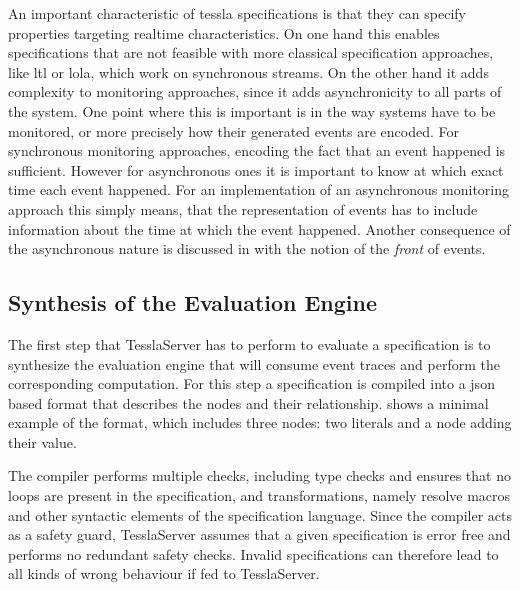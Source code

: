 An important characteristic of \gls{tessla} specifications is that they can specify properties targeting realtime characteristics.
On one hand this enables specifications that are not feasible with more classical specification approaches, like \gls{ltl} or \gls{lola}, which work on synchronous streams.
On the other hand it adds complexity to monitoring approaches, since it adds asynchronicity to all parts of the system.
One point where this is important is in the way systems have to be monitored, or more precisely how their generated events are encoded.
For synchronous monitoring approaches, encoding the fact that an event happened is sufficient.
However for asynchronous ones it is important to know at which exact time each event happened.
For an implementation of an asynchronous monitoring approach this simply means, that the representation of events has to include information about the time at which the event happened.
Another consequence of the asynchronous nature is discussed in  with the notion of the \emph{front} of events.

\subsection{Synthesis of the Evaluation Engine}

The first step that TesslaServer has to perform to evaluate a specification is to synthesize the evaluation engine that will consume event traces and perform the corresponding computation.
For this step a specification is compiled into a \gls{json} based format that describes the nodes and their relationship.
 shows a minimal example of the format, which includes three nodes: two literals and a node adding their value.



The compiler performs multiple checks, including type checks and ensures that no loops are present in the specification, and transformations, namely resolve macros and other syntactic elements of the specification language.
Since the compiler acts as a safety guard, TesslaServer assumes that a given specification is error free and performs no redundant safety checks.
Invalid specifications can therefore lead to all kinds of wrong behaviour if fed to TesslaServer.


